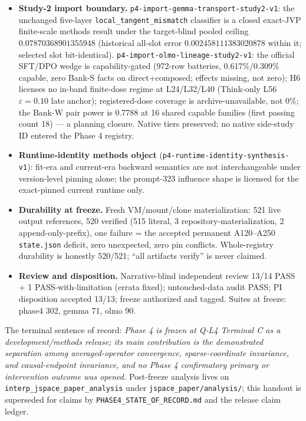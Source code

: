 \documentclass[10pt]{article}
\begin{document}
\begin{itemize}
\item \textbf{Study-2 import boundary.}
\texttt{p4-import-gemma-transport-study2-v1}: the unchanged five-layer
\texttt{local\_tangent\_mismatch} classifier is a closed exact-JVP
finite-scale methods result under the target-blind pooled ceiling
$0.07870368901355948$ (historical all-slot error
$0.002458111383020878$ within it; selected slot bit-identical).
\texttt{p4-import-olmo-lineage-study2-v1}: the official SFT/DPO wedge
is capability-gated (972-row batteries, 0.617\%/0.309\% capable, zero
Bank-S facts on direct+composed; effects missing, not zero); H6
licenses no in-band finite-dose regime at L24/L32/L40 (Think-only L56
$\varepsilon{=}0.10$ late anchor); registered-dose coverage is
archive-unavailable, not 0\%; the Bank-W pair power is 0.7788 at 16
shared capable families (first passing count 18) --- a planning
closure. Native tiers preserved; no native side-study ID entered the
Phase 4 registry.
\item \textbf{Runtime-identity methods object}
(\texttt{p4-runtime-identity-synthesis-v1}): fit-era and current-era
backward semantics are not interchangeable under version-level pinning
alone; the prompt-323 influence shape is licensed for the exact-pinned
current runtime only.
\item \textbf{Durability at freeze.} Fresh VM/mount/clone
materialization: 521 live output references, 520 verified (515
literal, 3 repository-materialization, 2 append-only-prefix), one
failure = the accepted permanent A120--A250 \texttt{state.json}
deficit, zero unexpected, zero pin conflicts. Whole-registry
durability is honestly 520/521; ``all artifacts verify'' is never
claimed.
\item \textbf{Review and disposition.} Narrative-blind independent
review 13/14 PASS + 1 PASS-with-limitation (errata fixed);
untouched-data audit PASS; PI disposition accepted 13/13; freeze
authorized and tagged. Suites at freeze: phase4 302, gemma 71, olmo
90.
\end{itemize}

The terminal sentence of record: \emph{Phase 4 is frozen at Q-L4
Terminal C as a development/methods release; its main contribution is
the demonstrated separation among averaged-operator convergence,
sparse-coordinate invariance, and causal-endpoint invariance, and no
Phase 4 confirmatory primary or intervention outcome was opened.}
Post-freeze analysis lives on \texttt{interp\_jspace\_paper\_analysis}
under \texttt{jspace\_paper/analysis/}; this handout is superseded for
claims by \texttt{PHASE4\_STATE\_OF\_RECORD.md} and the release claim
ledger.
\end{document}
